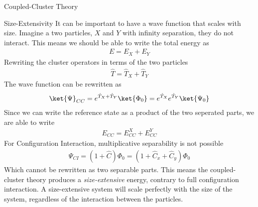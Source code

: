 \documentclass[twoside,english]{uiofysmaster}
\begin{document}
\begin{chapter}{Coupled-Cluster Theory}
  	\begin{section}{Size-Extensivity}
  		It can be important to have a wave function that scales with size. Imagine a two particles, $X$ and $Y$ with infinity separation, they do not interact. This means we should be able to write the total energy as
  		\begin{align}
  			E = E_X + E_Y
  		\end{align}
  		Rewriting the cluster operators in terms of the two particles
  		\begin{align}
  			\hat T = \hat T_X + \hat T_Y 
  		\end{align}
  		The wave function can be rewritten as 
  		\begin{align}
  			\ket{\Psi}_{CC} = e^{\hat T_X + \hat T_Y} \ket{\Phi_0} = e^{\hat T_X} e^{\hat T_Y} \ket{\Psi_0}
  		\end{align}
  		Since we can write the reference state as a product of the two seperated parts, we are able to write
  		\begin{align}
  			E_{CC} = E_{CC}^X + E_{CC}^Y
  		\end{align}
  		For Configuration Interaction, multiplicative separability is not possible
  		\begin{align}
  			\Psi_{CI} = \left(1 + \hat C\right) \Phi_0 = \left( 1 + \hat C_x + \hat C_y \right) \Phi_0
  		\end{align}
  		Which cannot be rewritten as two separable parts. This means the coupled-cluster theory produces a \textit{size-extensive} energy, contrary to full configuration interaction. A size-extensive system will scale perfectly with the size of the system, regardless of the interaction between the particles.

  	\end{section}


\end{chapter}
\end{document}
